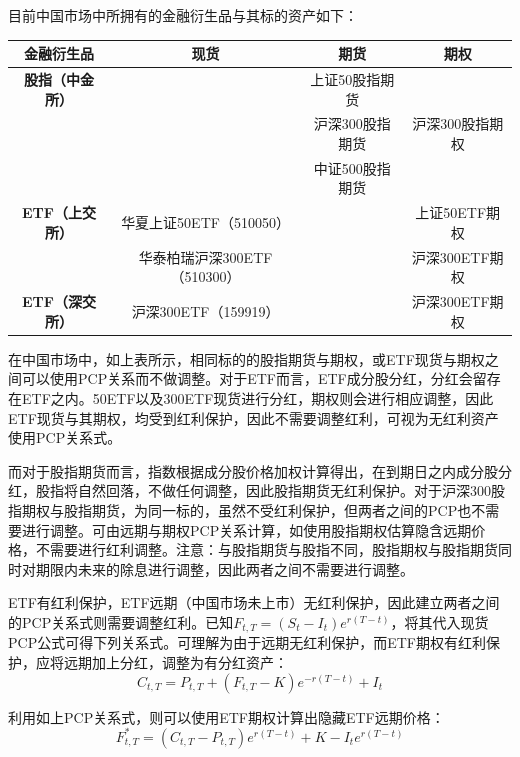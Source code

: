 \documentclass[11pt]{article}
\begin{document}
目前中国市场中所拥有的金融衍生品与其标的资产如下：
\begin{table}[H]
\centering
\begin{tabular}{@{}cccc@{}}
\toprule
\textbf{金融衍生品}    & \textbf{现货}          & \textbf{期货} & \textbf{期权} \\ \midrule
\textbf{股指（中金所）}  &                      & 上证50股指期货    &             \\
\textbf{}         &                      & 沪深300股指期货   & 沪深300股指期权   \\
\textbf{}         &                      & 中证500股指期货   &             \\
\textbf{ETF（上交所）} & 华夏上证50ETF（510050）    &             & 上证50ETF期权   \\
\textbf{}         & 华泰柏瑞沪深300ETF（510300） &             & 沪深300ETF期权  \\
\textbf{ETF（深交所）} & 沪深300ETF（159919）     &             & 沪深300ETF期权  \\ \bottomrule
\end{tabular}
\end{table}

在中国市场中，如上表所示，相同标的的股指期货与期权，或ETF现货与期权之间可以使用PCP关系而不做调整。对于ETF而言，ETF成分股分红，分红会留存在ETF之内。50ETF以及300ETF现货进行分红，期权则会进行相应调整，因此ETF现货与其期权，均受到红利保护，因此不需要调整红利，可视为无红利资产使用PCP关系式。

而对于股指期货而言，指数根据成分股价格加权计算得出，在到期日之内成分股分红，股指将自然回落，不做任何调整，因此股指期货无红利保护。对于沪深300股指期权与股指期货，为同一标的，虽然不受红利保护，但两者之间的PCP也不需要进行调整。可由远期与期权PCP关系计算，如使用股指期权估算隐含远期价格，不需要进行红利调整。注意：与股指期货与股指不同，股指期权与股指期货同时对期限内未来的除息进行调整，因此两者之间不需要进行调整。

ETF有红利保护，ETF远期（中国市场未上市）无红利保护，因此建立两者之间的PCP关系式则需要调整红利。已知$F_{t,T} = (S_t - I_t)e^{r(T-t)}$，将其代入现货PCP公式可得下列关系式。可理解为由于远期无红利保护，而ETF期权有红利保护，应将远期加上分红，调整为有分红资产：
\begin{equation*}
    C_{t,T} = P_{t,T} + \left( F_{t,T}-K \right) e^{-r(T-t)} + I_t
\end{equation*}

利用如上PCP关系式，则可以使用ETF期权计算出隐藏ETF远期价格：
\begin{equation*}
    F^*_{t,T} = \left( C_{t,T} - P_{t,T} \right) e^{r(T-t)} + K - I_t e^{r(T-t)}
\end{equation*}
\end{document}
